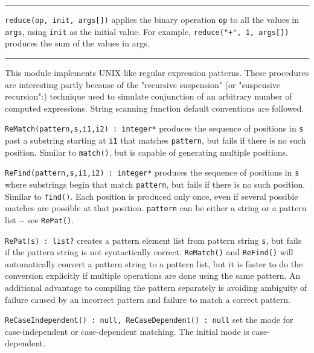 \vspace{0.25cm}\hrule{}

\texttt{reduce(op, init, args[])} applies the binary
operation \texttt{op} to all the values in \texttt{args}, using
\texttt{init} as the initial value. For example,
\texttt{reduce("+", 1, args[])} produces
the sum of the values in args. 

\vspace{0.25cm}\hrule{}

This module implements UNIX-like regular
expression patterns. These procedures are interesting partly because of
the "recursive suspension" (or
"suspensive recursion":)
technique used to simulate conjunction of an arbitrary number of
computed expressions. String scanning function
default conventions are followed.

\texttt{ReMatch(pattern,s,i1,i2) : integer*} produces the sequence of
positions in \texttt{s} past a substring starting at \texttt{i1} that
matches \texttt{pattern}, but fails if there is no such position.
Similar to \texttt{match()}, but is capable of generating multiple
positions.

\texttt{ReFind(pattern,s,i1,i2) : integer*} produces the sequence of
positions in \texttt{s} where substrings begin that match
\texttt{pattern}, but fails if there is no such position. Similar to
\texttt{find()}. Each position is produced only once, even if several
possible matches are possible at that position. \texttt{pattern} can be
either a string or a pattern list -{}- see \texttt{RePat()}.

\texttt{RePat(s) : list?} creates a pattern element list from pattern
string \texttt{s}, but fails if the pattern string is not syntactically
correct. \texttt{ReMatch()} and \texttt{ReFind()} will automatically
convert a pattern string to a pattern list, but it is faster to do the
conversion explicitly if multiple operations are done using the same
pattern. An additional advantage to compiling the pattern separately is
avoiding ambiguity of failure caused by an incorrect pattern and
failure to match a correct pattern.

\texttt{ReCaseIndependent() : null, ReCaseDependent() : null} set the
mode for case-independent or case-dependent matching. The initial mode
is case-dependent.

